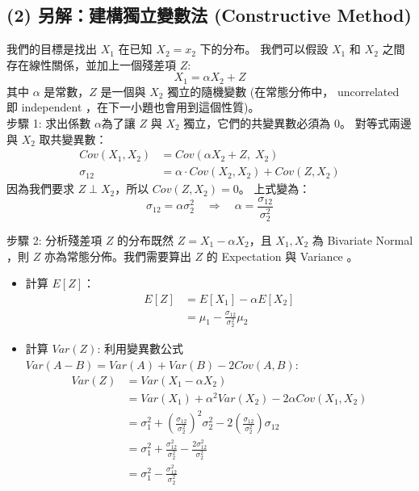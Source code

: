 \documentclass{article}
\begin{document}
\subsection*{(2) 另解：建構獨立變數法 (Constructive Method)}
我們的目標是找出 $X_1$ 在已知 $X_2=x_2$ 下的分布。
我們可以假設 $X_1$ 和 $X_2$ 之間存在線性關係，並加上一個殘差項 $Z$:
$$X_1 = \alpha X_2 + Z$$
其中 $\alpha$ 是常數，$Z$ 是一個與 $X_2$ 獨立的隨機變數 
(在常態分佈中， uncorrelated 即 independent ，在下一小題也會用到這個性質)。\\

步驟 1:
求出係數 $\alpha$為了讓 $Z$ 與 $X_2$ 獨立，它們的共變異數必須為 0。
對等式兩邊與 $X_2$ 取共變異數：
\begin{align*}
    Cov(X_1, X_2) &= Cov(\alpha X_2 + Z, \; X_2) \\
    \sigma_{12} &= \alpha \cdot Cov(X_2, X_2) + Cov(Z, X_2)
\end{align*}
因為我們要求 $Z \perp X_2$，所以 $Cov(Z, X_2) = 0$。
上式變為：
$$\sigma_{12} = \alpha \sigma_2^2 \quad \Longrightarrow \quad \boxed{\alpha = 
\frac{\sigma_{12}}{\sigma_2^2}}$$

步驟 2:
分析殘差項 $Z$ 的分布既然 $Z = X_1 - \alpha X_2$，且 $X_1, X_2$ 為 Bivariate Normal 
，則 $Z$ 亦為常態分佈。我們需要算出 $Z$ 的 Expectation 與 Variance 。
\begin{itemize}
    \item 計算 $E[Z]$：
    \begin{align*}
        E[Z] &= E[X_1] - \alpha E[X_2] \\
        &= \mu_1 - \frac{\sigma_{12}}{\sigma_2^2}\mu_2
    \end{align*}
    \item 計算 $Var(Z)$:
    利用變異數公式 $Var(A - B) = Var(A) + Var(B) - 2Cov(A,B)$:
    \begin{align*}
        Var(Z) &= Var(X_1 - \alpha X_2) \\
        &= Var(X_1) + \alpha^2 Var(X_2) - 2\alpha Cov(X_1, X_2) \\
        &= \sigma_1^2 + \left(\frac{\sigma_{12}}{\sigma_2^2}\right)^2 \sigma_2^2 - 2\left(\frac{\sigma_{12}}{\sigma_2^2}\right) \sigma_{12} \\
        &= \sigma_1^2 + \frac{\sigma_{12}^2}{\sigma_2^2} - \frac{2\sigma_{12}^2}{\sigma_2^2} \\
        &= \sigma_1^2 - \frac{\sigma_{12}^2}{\sigma_2^2}
    \end{align*}
\end{itemize}
\end{document}
